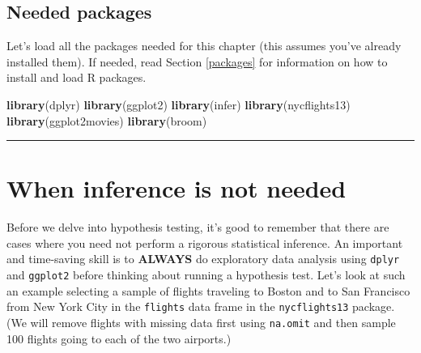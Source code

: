 \documentclass[12pt, krantz2,]{krantz}
\makeatletter
\newenvironment{Shaded}{\begin{snugshade}}{\end{snugshade}}
\newcommand{\DecValTok}[1]{\textcolor[rgb]{0.06,0.06,0.06}{#1}}
\newcommand{\KeywordTok}[1]{\textcolor[rgb]{0.27,0.27,0.27}{\textbf{#1}}}
\newcommand{\NormalTok}[1]{#1}
\newcommand{\OperatorTok}[1]{\textcolor[rgb]{0.43,0.43,0.43}{\textbf{#1}}}
\newcommand{\StringTok}[1]{\textcolor[rgb]{0.5,0.5,0.5}{#1}}
\newenvironment{kframe}{%
\medskip{}
\setlength{\fboxsep}{.8em}
 \def\at@end@of@kframe{}%
 \ifinner\ifhmode%
  \def\at@end@of@kframe{\end{minipage}}%
  \begin{minipage}{\columnwidth}%
 \fi\fi%
 \def\FrameCommand##1{\hskip\@totalleftmargin \hskip-\fboxsep
 \colorbox{shadecolor}{##1}\hskip-\fboxsep
     \hskip-\linewidth \hskip-\@totalleftmargin \hskip\columnwidth}%
 \MakeFramed {\advance\hsize-\width
   \@totalleftmargin\z@ \linewidth\hsize
   \@setminipage}}%
 {\par\unskip\endMakeFramed%
 \at@end@of@kframe}
\renewenvironment{Shaded}{\begin{kframe}}{\end{kframe}}
\makeatother
\begin{document}
\hypertarget{needed-packages-8}{%
\subsection*{Needed packages}\label{needed-packages-8}}


Let's load all the packages needed for this chapter (this assumes you've already installed them). If needed, read Section \ref{packages} for information on how to install and load R packages.

\begin{Shaded}
\begin{Highlighting}[]
\KeywordTok{library}\NormalTok{(dplyr)}
\KeywordTok{library}\NormalTok{(ggplot2)}
\KeywordTok{library}\NormalTok{(infer)}
\KeywordTok{library}\NormalTok{(nycflights13)}
\KeywordTok{library}\NormalTok{(ggplot2movies)}
\KeywordTok{library}\NormalTok{(broom)}
\end{Highlighting}
\end{Shaded}

\begin{center}\rule{0.5\linewidth}{\linethickness}\end{center}

\hypertarget{when-inference-is-not-needed}{%
\section{When inference is not needed}\label{when-inference-is-not-needed}}

Before we delve into hypothesis testing, it's good to remember that there are cases where you need not perform a rigorous statistical inference. An important and time-saving skill is to \textbf{ALWAYS} do exploratory data analysis using \texttt{dplyr} and \texttt{ggplot2} before thinking about running a hypothesis test. Let's look at such an example selecting a sample of flights traveling to Boston and to San Francisco from New York City in the \texttt{flights} data frame in the \texttt{nycflights13} package. (We will remove flights with missing data first using \texttt{na.omit} and then sample 100 flights going to each of the two airports.)

\begin{Shaded}
\end{Shaded}
\end{document}
